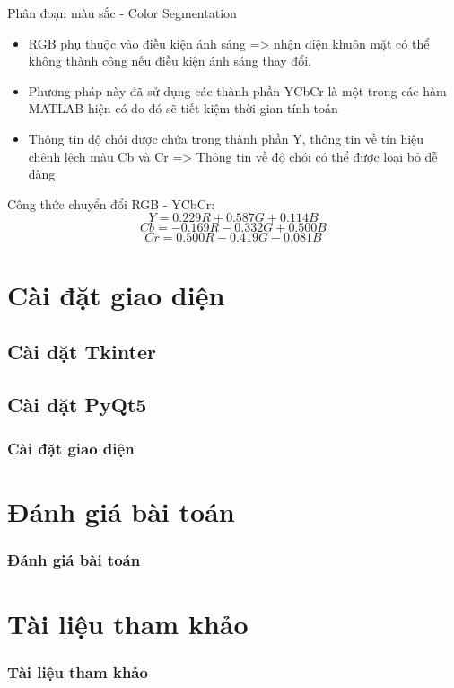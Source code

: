\documentclass[10.5pt]{beamer}
\begin{document}
\begin{frame}{\fontsize{11.5pt}{12.5pt}\selectfont Phân đoạn màu sắc - Color Segmentation}
	\begin{itemize}
		\item \fontsize{7.5pt}{10.5pt}\selectfont RGB phụ thuộc vào điều kiện ánh sáng => nhận diện khuôn mặt có thể không thành công nếu điều kiện ánh sáng thay đổi.
		\item \fontsize{7.5pt}{10.5pt}\selectfont Phương pháp này đã sử dụng các thành phần YCbCr là một trong các hàm MATLAB hiện có \makebox[0.5cm]{\[\Rightarrow\]} do đó sẽ tiết kiệm thời gian tính toán
		\item \fontsize{7.5pt}{10.5pt}\selectfont Thông tin độ chói được chứa trong thành phần Y, thông tin về tín hiệu chênh lệch màu Cb và Cr => Thông tin về độ chói có thể được loại bỏ dễ dàng
	\end{itemize}
	\begin{block} {\fontsize{9pt}{10.5pt}\selectfont Công thức chuyển đổi RGB - YCbCr: }
	\fontsize{6.5pt}{7.5pt}\selectfont
		\[Y = 0.229R + 0.587G + 0.114B\]
		\[Cb =  - 0.169R - 0.332G + 0.500B\]
		\[Cr = 0.500R - 0.419G - 0.081B\]
	\end{block}
\end{frame}

\section{\fontsize{8.5pt}{9.5pt}\selectfont Cài đặt giao diện}
\subsection{\fontsize{8.5pt}{9.5pt}\selectfont Cài đặt Tkinter}
\subsection{\fontsize{8.5pt}{9.5pt}\selectfont Cài đặt PyQt5}
\begin{frame}
	\frametitle{\fontsize{11.5pt}{12.5pt}\selectfont Cài đặt giao diện}
\end{frame}

\section{\fontsize{8.5pt}{9.5pt}\selectfont Đánh giá bài toán}
\begin{frame}
	\frametitle{\fontsize{11.5pt}{12.5pt}\selectfont Đánh giá bài toán}
\end{frame}
\section{\fontsize{8.5pt}{9.5pt}\selectfont Tài liệu tham khảo}
\begin{frame}
	\frametitle{\fontsize{11.5pt}{12.5pt}\selectfont Tài liệu tham khảo}
\end{frame}
\end{document}
